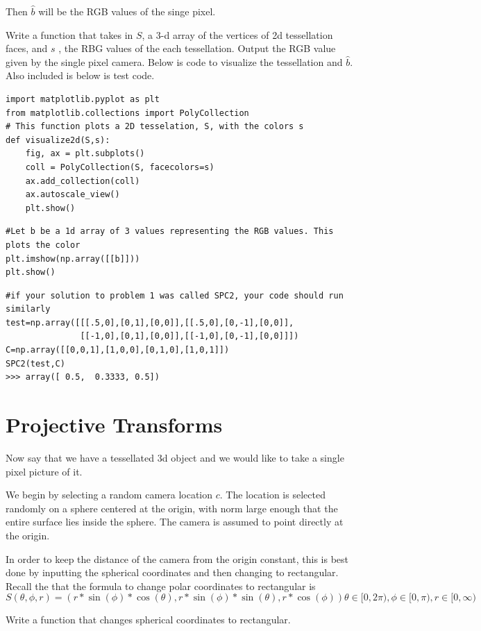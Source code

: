 Then $\hat{b}$ will be the RGB values of the singe pixel.

\begin{problem}
Write a function that takes in $S$, a 3-d array of the vertices of 2d tessellation faces, and $s$ , the RBG values of the each tessellation. Output the RGB value given by the single pixel camera. Below is code to visualize the tessellation and $\hat{b}$.  Also included is below is test code.
\end{problem}

\begin{lstlisting}
import matplotlib.pyplot as plt
from matplotlib.collections import PolyCollection
# This function plots a 2D tesselation, S, with the colors s 
def visualize2d(S,s):
    fig, ax = plt.subplots()
    coll = PolyCollection(S, facecolors=s)
    ax.add_collection(coll)
    ax.autoscale_view()
    plt.show()
\end{lstlisting}
\begin{lstlisting}
#Let b be a 1d array of 3 values representing the RGB values. This plots the color
plt.imshow(np.array([[b]]))
plt.show()
\end{lstlisting}
\begin{lstlisting}
#if your solution to problem 1 was called SPC2, your code should run similarly
test=np.array([[[.5,0],[0,1],[0,0]],[[.5,0],[0,-1],[0,0]],
               [[-1,0],[0,1],[0,0]],[[-1,0],[0,-1],[0,0]]])
C=np.array([[0,0,1],[1,0,0],[0,1,0],[1,0,1]])
SPC2(test,C)
>>> array([ 0.5,  0.3333, 0.5])
\end{lstlisting}

\section*{Projective Transforms}
Now say that we have a tessellated 3d object and we would like to take a single pixel picture of it.

We begin by selecting a random camera location $c$. The location is selected randomly on a sphere centered at the origin, with norm large enough that the entire surface lies inside the sphere. The camera is assumed to point directly at the origin.

In order to keep the distance of the camera from the origin constant, this is best done by inputting the spherical coordinates and then changing to rectangular. Recall the that the formula to change polar coordinates to rectangular is 
\[
S(\theta,\phi,r)=(r*\sin(\phi)*\cos(\theta),r*\sin(\phi)*\sin(\theta),r*\cos(\phi))
\theta \in [0,2\pi),\phi \in [0,\pi), r \in [0,\infty)
\]
\begin{problem}
Write a function that changes spherical coordinates to rectangular.
\end{problem}

